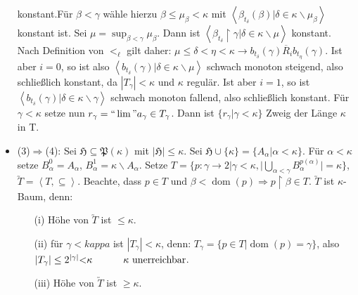 \documentclass[a4paper,fontsize=11pt]{scrartcl}
\newcommand{\mathnode}[2]{%
  \mathord{\tikz[baseline=(#1.base), inner sep = 0pt]{\node (#1) {$#2$};}}}
\newcommand{\dom}{\operatorname{dom}}
\begin{document}
\begin{itemize}
      konstant.\newline Für $\beta<\gamma$ wähle hierzu
      $\beta\le\mu_\beta<\kappa$ mit $\left<\beta_{t_\delta}(\beta)|
      \delta\in\kappa\backslash\mu_\beta\right>$ konstant ist. Sei
      $\mu=\sup_{\beta<\gamma}\mu_\beta$. Dann ist
      $\left<\beta_{t_\delta}\upharpoonright\gamma|
      \delta\in\kappa\backslash\mu\right>$ konstant. Nach Definition
      von $<_\ell$ gilt daher: $\mu\le\delta<\eta<\kappa\rightarrow
      b_{t_\delta}(\gamma)\overline{R}_i b_{t_\eta}(\gamma)$. Ist aber
      $i=0$, so ist also
      $\left<b_{t_\delta}(\gamma)|\delta\in\kappa\backslash\mu\right>$
      schwach monoton steigend, also schließlich konstant, da
      $|T_\gamma|<\kappa$ und $\kappa$ regulär. Ist aber $i=1$, so ist
      $\left<b_{t_\delta}(\gamma)|\delta\in\kappa\backslash\gamma\right>$
      schwach monoton fallend, also schließlich konstant. Für
      $\gamma<\kappa$ setze nun
      $r_\gamma=\mbox{``}\lim\mbox{\textquotedblright} a_\gamma \in
      T_\gamma$. Dann ist $\{r_\gamma|\gamma<\kappa\}$ Zweig der Länge
      $\kappa$ in T.
    \item (3)$\Rightarrow$(4): Sei
      $\mathfrak{H}\subseteq\mathfrak{P}(\kappa)$ mit
      $|\mathfrak{H}|\le\kappa$. Sei
      $\mathfrak{H}\cup\{\kappa\}=\{A_\alpha|\alpha<\kappa\}$. Für
      $\alpha<\kappa$ setze $B_\alpha^0=A_\alpha$,
      $B_\alpha^1=\kappa\backslash A_\alpha$. Setze
      $T=\{p:\gamma\rightarrow 2|\gamma<\kappa,
      |\bigcup\limits_{\alpha<\gamma}B_\alpha^{p(\alpha)}|=\kappa\}$,
      $\utilde{T}=\left<T,\subseteq\right>$. Beachte, dass $p\in
      T\mbox{ und }\beta<\dom(p)\Rightarrow p\upharpoonright\beta\in
      T$. $\utilde{T}$ ist $\kappa$-Baum, denn:
      \begin{itemize}
      \item[(i)] Höhe von $\utilde{T}$ ist $\le\kappa$.
      \item[(ii)] für $\gamma<kappa$ ist $|T_\gamma|<\kappa$, denn:
        \vspace{20pt}$T_\gamma=\{p\in T|\dom(p)=\gamma\}$, also $|T_\gamma|\le
        2^{|\gamma|}\mathnode{l1}{<}\kappa \mathnode{l2}{{\phantom{aaa\mbox{daa}}\kappa\mbox{ unerreichbar}}}$.
        \item[(iii)] Höhe von $\utilde{T}$ ist $\ge\kappa$.
      \end{itemize}

\end{itemize}
\end{document}
